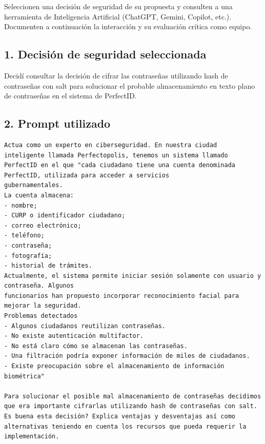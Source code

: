 
Seleccionen una decisión de seguridad de su propuesta y consulten a una herramienta de Inteligencia Artificial (ChatGPT, Gemini, Copilot, etc.). Documenten a continuación la interacción y su evaluación crítica como equipo.

\subsection*{1. Decisión de seguridad seleccionada}


Decidí consultar la decisión de cifrar las contraseñas utilizando hash de contraseñas con salt para solucionar el probable almacenamiento en texto plano de contraseñas en el sistema de PerfectID.
\subsection*{2. Prompt utilizado}
\begin{lstlisting}[style=gris]
% TODO: Escribir aqui el prompt exacto enviado a la IA
Actua como un experto en ciberseguridad. En nuestra ciudad
inteligente llamada Perfectopolis, tenemos un sistema llamado PerfectID en el que "cada ciudadano tiene una cuenta denominada PerfectID, utilizada para acceder a servicios
gubernamentales.
La cuenta almacena:
- nombre;
- CURP o identificador ciudadano;
- correo electrónico;
- teléfono;
- contraseña;
- fotografía;
- historial de trámites.
Actualmente, el sistema permite iniciar sesión solamente con usuario y contraseña. Algunos
funcionarios han propuesto incorporar reconocimiento facial para mejorar la seguridad.
Problemas detectados
- Algunos ciudadanos reutilizan contraseñas.
- No existe autenticación multifactor.
- No está claro cómo se almacenan las contraseñas.
- Una filtración podría exponer información de miles de ciudadanos.
- Existe preocupación sobre el almacenamiento de información biométrica"

Para solucionar el posible mal almacenamiento de contraseñas decidimos que era importante cifrarlas utilizando hash de contraseñas con salt. Es buena esta decisión? Explica ventajas y desventajas así como alternativas teniendo en cuenta los recursos que pueda requerir la implementación.
\end{lstlisting}

